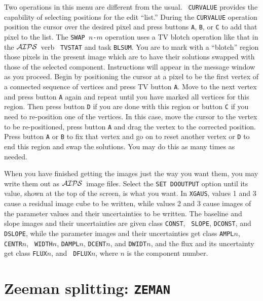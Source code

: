 \documentclass[twoside]{article}
\newcommand{\AIPS}{{$\cal AIPS\/$}}
\begin{document}
Two operations in this menu are different from the usual.  {\tt
  CURVALUE} provides the capability of selecting positions for the
edit ``list.''  During the {\tt CURVALUE} operation position the
cursor over the desired pixel and press buttons {\tt A}, {\tt B}, or
{\tt C} to add that pixel to the list.  The {\tt SWAP $n$-$m$}
operation uses a TV blotch operation like that in the \AIPS\ verb {\tt
  TVSTAT} and task {\tt BLSUM}\@.  You are to mark with a ``blotch''
region those pixels in the present image which are to have their
solutions swapped with those of the selected component.  Instructions
will appear in the message window as you proceed.  Begin by
positioning the cursor at a pixel to be the first vertex of a
connected sequence of vertices and press TV button {\tt A}\@.  Move to
the next vertex and press button {\tt A} again and repeat until you
have marked all vertices for this region.  Then press button {\tt D}
if you are done with this region or button {\tt C} if you need to
re-position one of the vertices.  In this case, move the cursor to the
vertex to be re-positioned, press button {\tt A} and drag the vertex to
the corrected position.  Press button {\tt A} or {\tt B} to fix that
vertex and go on to reset another vertex or {\tt D} to end this region
and swap the solutions.  You may do this as many times as needed.

When you have finished getting the images just the way you want them,
you may write them out as \AIPS\ image files.  Select the {\tt SET
  DOOUTPUT} option until its value, shown at the top of the screen, is
what you want.  In {\tt XGAUS}, values 1 and 3 cause a residual image
cube to be written, while values 2 and 3 cause images of the parameter
values and their uncertainties to be written.  The baseline and slope
images and their uncertainties are given class {\tt CONST}, {\tt
  SLOPE}, {\tt DCONST}, and {\tt DSLOPE}, while the parameter images
and their uncertainties get class {\tt AMPL$n$}, {\tt CENTR$n$}, {\tt
  WIDTH$n$}, {\tt DAMPL$n$}, {\tt DCENT$n$}, and {\tt DWIDT$n$}, and
the flux and its uncertainty get class {\tt FLUX$n$}, and {\tt
  DFLUX$n$}, where $n$ is the component number.

\section{Zeeman splitting: {\tt ZEMAN}}
\end{document}
